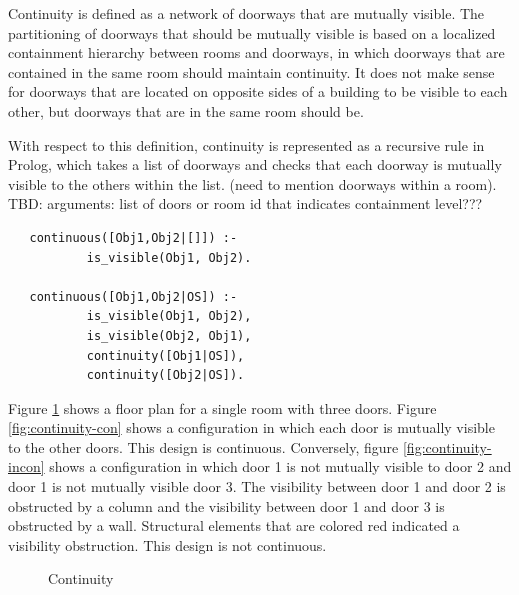 \documentclass[12pt]{ucthesis}
\begin{document}
Continuity is defined as a network of doorways that are mutually visible. The partitioning of doorways that should be mutually visible is based on a localized containment hierarchy between rooms and doorways, in which doorways that are contained in the same room should maintain continuity. It does not make sense for doorways that are located on opposite sides of a building to be visible to each other, but doorways that are in the same room should be. 

With respect to this definition, continuity is represented as a recursive rule in Prolog, which takes a list of doorways and checks that each doorway is mutually visible to the others within the list. (need to mention doorways within a room). TBD: arguments: list of doors or room id that indicates containment level???

\begin{verbatim}
   continuous([Obj1,Obj2|[]]) :- 
           is_visible(Obj1, Obj2).

   continuous([Obj1,Obj2|OS]) :- 
           is_visible(Obj1, Obj2),
	       is_visible(Obj2, Obj1),
           continuity([Obj1|OS]),
           continuity([Obj2|OS]).
\end{verbatim}

Figure \ref{continuity} shows a floor plan for a single room with three doors. Figure \ref{fig:continuity-con} shows a configuration in which each door is mutually visible to the other doors. This design is continuous. Conversely, figure \ref{fig:continuity-incon} shows a configuration in which door 1 is not mutually visible to door 2 and door 1 is not mutually visible door 3. The visibility between door 1 and door 2 is obstructed by a column and the visibility between door 1 and door 3 is obstructed by a wall. Structural elements that are colored red indicated a visibility obstruction. This design is not continuous. 

\begin{figure}[H]
 \centering
  \hspace{30 mm}
 \caption{Continuity}
\label{continuity}
\end{figure}
\end{document}
